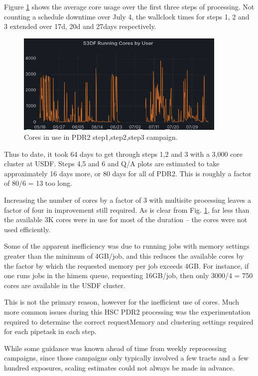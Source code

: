 Figure \ref{fig:cores} shows the average core usage over the first
three steps of processing.  Not counting a schedule downtime 
over July 4, the wallclock times for steps 1, 2 and 3 extended over
17d, 20d and 27days respectively.

\begin{figure}
\includegraphics[width=0.9\textwidth]{Campcorespdr2.png}
\caption{Cores in use in PDR2 step1,step2,step3 campaign.}  \label{fig:cores}
\end{figure}

Thus to date, it took 64 days to get through 
steps 1,2 and 3 with a 3,000 core cluster at USDF.  
Steps 4,5 and 6 and Q/A plots are estimated to take approximately 
16 days more, or 80 days for all of PDR2.   This is roughly a 
factor of 80/6 = 13 too long.

Increasing the number of cores by a factor of 3 with multisite processing
leaves a factor of four in improvement still required.
As is clear from Fig. \ref{fig:cores}, far less than the available 3K cores
were in use for most of the duration -- the cores were not used
efficiently.

Some of the apparent inefficiency was due to running jobs with memory
settings greater than the minimum of 4GB/job, and this reduces the available
cores by the factor by which the requested memory per job exceeds 4GB.
For instance, if one runs jobs in the himem queue, requesting 16GB/job,
then only 3000/4 = 750 cores are available in the USDF cluster.

This is not the primary reason, however for the inefficient use of cores.
Much more common issues during this HSC PDR2 processing was the 
experimentation required to  determine the correct requestMemory and clustering
settings required for each pipetask in each step.

While some guidance was known ahead of time from weekly reprocessing
campaigns, since those campaigns only typically involved a few tracts and
a few hundred exposures, scaling estimates could not always be made
in advance.

